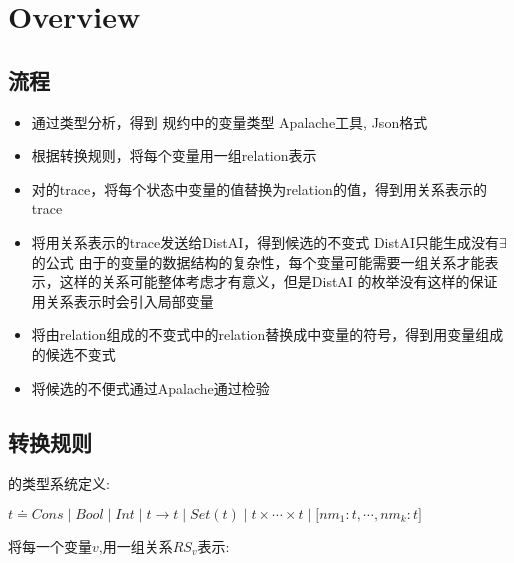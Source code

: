 
\section{Overview}  \label{section:overview}


\subsection{流程}\label{ss:invgen}

\begin{itemize}
  \item 通过类型分析，得到\tlaplus{} 规约中的变量类型
  \subitem Apalache工具, Json格式
  \item 根据转换规则，将每个变量用一组relation表示
  \item 对\tlaplus{}的trace，将每个状态中变量的值替换为relation的值，得到用关系表示的trace
  \item 将用关系表示的trace发送给DistAI，得到候选的不变式
  \subitem DistAI只能生成没有$\exists$的公式
  \subitem 由于\tlaplus{}的变量的数据结构的复杂性，每个变量可能需要一组关系才能表示，这样的关系可能整体考虑才有意义，但是DistAI
    的枚举没有这样的保证
  \subitem 用关系表示时会引入局部变量
  \item 将由relation组成的不变式中的relation替换成\tlaplus{}中变量的符号，得到用\tlaplus{}变量组成的候选不变式
  \item 将候选的不便式通过Apalache通过检验
\end{itemize}

\subsection{转换规则}\label{ss:transrule}


\tlaplus{} 的类型系统定义: 

$
  t \doteq Cons 
  \mid Bool 
  \mid Int 
  \mid t \rightarrow t 
  \mid Set(t) 
  \mid t\times\cdots\times t 
  \mid \lbrack nm_1:t,\cdots,nm_k:t\rbrack

$

将每一个变量$v$,用一组关系$RS_v$表示:


